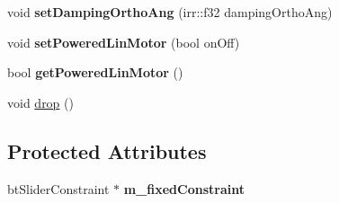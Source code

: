 \begin{DoxyCompactItemize}
\item 
\hypertarget{class_c_irr_b_p_slide_constraint_a1390d767b6988d6158053c3a5f2b839f}{
void {\bfseries setDampingOrthoAng} (irr::f32 dampingOrthoAng)}
\label{class_c_irr_b_p_slide_constraint_a1390d767b6988d6158053c3a5f2b839f}

\item 
\hypertarget{class_c_irr_b_p_slide_constraint_a3565a2a2cd586e2dc248db1d5c595a05}{
void {\bfseries setPoweredLinMotor} (bool onOff)}
\label{class_c_irr_b_p_slide_constraint_a3565a2a2cd586e2dc248db1d5c595a05}

\item 
\hypertarget{class_c_irr_b_p_slide_constraint_aab1330eb896120c51334eb617154982e}{
bool {\bfseries getPoweredLinMotor} ()}
\label{class_c_irr_b_p_slide_constraint_aab1330eb896120c51334eb617154982e}

\item 
void \hyperlink{class_c_irr_b_p_slide_constraint_acaaf3cfaba14b8c126ab548f7c21c2b6}{drop} ()
\end{DoxyCompactItemize}
\subsection*{Protected Attributes}
\begin{DoxyCompactItemize}
\item 
\hypertarget{class_c_irr_b_p_slide_constraint_addc70a99abc01da40b54ccb18bc35ab5}{
btSliderConstraint $\ast$ {\bfseries m\_\-fixedConstraint}}
\label{class_c_irr_b_p_slide_constraint_addc70a99abc01da40b54ccb18bc35ab5}

\end{DoxyCompactItemize}


